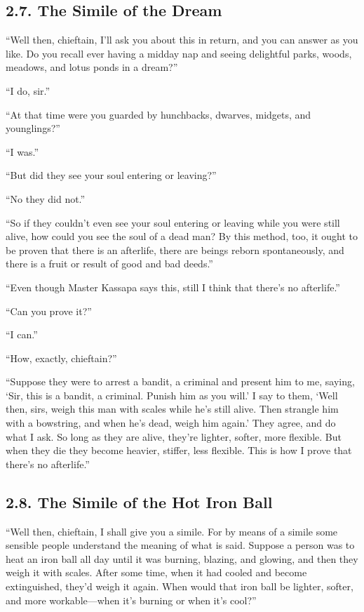 \documentclass[12pt,openany]{book}%
\begin{document}
\subsection*{2.7. The Simile of the Dream }

“Well then, chieftain, I’ll ask you about this in return, and you can answer as you like. Do you recall ever having a midday nap and seeing delightful parks, woods, meadows, and lotus ponds in a dream?” 

“I do, sir.” 

“At that time were you guarded by hunchbacks, dwarves, midgets, and younglings?” 

“I was.” 

“But did they see your soul entering or leaving?” 

“No they did not.” 

“So if they couldn’t even see your soul entering or leaving while you were still alive, how could you see the soul of a dead man? By this method, too, it ought to be proven that there is an afterlife, there are beings reborn spontaneously, and there is a fruit or result of good and bad deeds.” 

“Even though Master Kassapa says this, still I think that there’s no afterlife.” 

“Can you prove it?” 

“I can.” 

“How, exactly, chieftain?” 

“Suppose they were to arrest a bandit, a criminal and present him to me, saying, ‘Sir, this is a bandit, a criminal. Punish him as you will.’ I say to them, ‘Well then, sirs, weigh this man with scales while he’s still alive. Then strangle him with a bowstring, and when he’s dead, weigh him again.’ They agree, and do what I ask. So long as they are alive, they’re lighter, softer, more flexible. But when they die they become heavier, stiffer, less flexible. This is how I prove that there’s no afterlife.” 

\subsection*{2.8. The Simile of the Hot Iron Ball }

“Well then, chieftain, I shall give you a simile. For by means of a simile some sensible people understand the meaning of what is said. Suppose a person was to heat an iron ball all day until it was burning, blazing, and glowing, and then they weigh it with scales. After some time, when it had cooled and become extinguished, they’d weigh it again. When would that iron ball be lighter, softer, and more workable—when it’s burning or when it’s cool?” 
\end{document}
